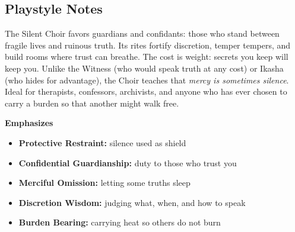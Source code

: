 \subsection*{Playstyle Notes}
The Silent Choir favors guardians and confidants: those who stand between fragile lives and ruinous truth. Its rites fortify discretion, temper tempers, and build rooms where trust can breathe. The cost is weight: secrets you keep will keep you. Unlike the Witness (who would speak truth at any cost) or Ikasha (who hides for advantage), the Choir teaches that \textit{mercy is sometimes silence}. Ideal for therapists, confessors, archivists, and anyone who has ever chosen to carry a burden so that another might walk free.

\noindent\textbf{Emphasizes}
\begin{itemize}
  \item \textbf{Protective Restraint:} silence used as shield
  \item \textbf{Confidential Guardianship:} duty to those who trust you
  \item \textbf{Merciful Omission:} letting some truths sleep
  \item \textbf{Discretion Wisdom:} judging what, when, and how to speak
  \item \textbf{Burden Bearing:} carrying heat so others do not burn
\end{itemize}

